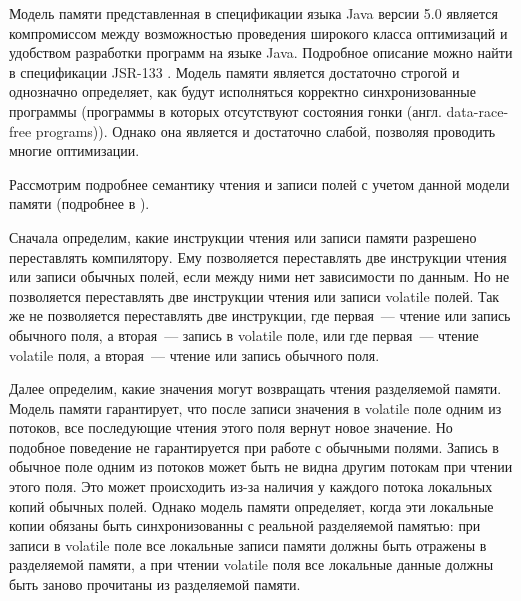 \documentclass[14pt,titlepage]{extarticle}
\newcommand{\eng}[1]{{\English#1}}
\begin{document}
      Модель памяти представленная в спецификации языка Java версии 5.0 является
      компромиссом между возможностью проведения широкого класса оптимизаций и
      удобством разработки программ на языке Java. Подробное описание можно
      найти в спецификации JSR-133 \cite{jsr133}. Модель памяти является
      достаточно строгой и однозначно определяет, как будут исполняться
      корректно синхронизованные программы (программы в которых отсутствуют
      состояния гонки (англ. \eng{data-race-free programs})). Однако она
      является и достаточно слабой, позволяя проводить многие оптимизации.

      Рассмотрим подробнее семантику чтения и записи полей с учетом данной
      модели памяти (подробнее в \cite{jsr133_cookbook}).

      Сначала определим, какие инструкции чтения или записи памяти разрешено
      переставлять компилятору. Ему позволяется переставлять две инструкции
      чтения или записи обычных полей, если между ними нет зависимости по
      данным. Но не позволяется переставлять две инструкции чтения или записи
      \eng{volatile} полей. Так же не позволяется переставлять две инструкции,
      где первая~--- чтение или запись обычного поля, а вторая~--- запись в
      \eng{volatile} поле, или где первая~--- чтение \eng{volatile} поля, а
      вторая~--- чтение или запись обычного поля.

      Далее определим, какие значения могут возвращать чтения разделяемой
      памяти. Модель памяти гарантирует, что после записи значения в
      \eng{volatile} поле одним из потоков, все последующие чтения этого
      поля вернут новое значение. Но подобное поведение не гарантируется
      при работе с обычными полями. Запись в обычное поле одним из потоков
      может быть не видна другим потокам при чтении этого поля. Это может
      происходить из-за наличия у каждого потока локальных копий обычных полей.
      Однако модель памяти определяет, когда эти локальные копии обязаны быть
      синхронизованны с реальной разделяемой памятью: при записи в
      \eng{volatile} поле все локальные записи памяти должны быть отражены
      в разделяемой памяти, а при чтении \eng{volatile} поля все локальные
      данные должны быть заново прочитаны из разделяемой памяти.
\end{document}
